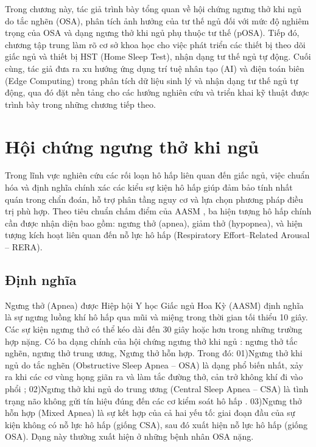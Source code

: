 
Trong chương này, tác giả trình bày tổng quan về hội chứng ngưng thở khi ngủ do
tắc nghẽn (OSA), phân tích ảnh hưởng của tư thế ngủ đối với mức độ nghiêm trọng
của OSA và dạng ngưng thở khi ngủ phụ thuộc tư thế (pOSA). Tiếp đó, chương tập
trung làm rõ cơ sở khoa học cho việc phát triển các thiết bị theo dõi giấc ngủ
và thiết bị HST (Home Sleep Test), nhận dạng tư thế ngủ tự động. Cuối cùng, tác
giả đưa ra xu hướng ứng dụng trí tuệ nhân tạo (AI) và điện toán biên (Edge
Computing) trong phân tích dữ liệu sinh lý và nhận dạng tư thế ngủ tự động, qua
đó đặt nền tảng cho các hướng nghiên cứu và triển khai kỹ thuật được trình bày
trong những chương tiếp theo.
\section{Hội chứng ngưng thở khi ngủ}

Trong lĩnh vực nghiên cứu các rối loạn hô hấp liên quan đến giấc ngủ, việc
chuẩn hóa và định nghĩa chính xác các kiểu sự kiện hô hấp giúp đảm bảo tính
nhất quán trong chẩn đoán, hỗ trợ phân tầng nguy cơ và lựa chọn phương pháp
điều trị phù hợp. Theo tiêu chuẩn chấm điểm của AASM \cite{berry2012scoring},
ba hiện tượng hô hấp chính cần được nhận diện bao gồm: ngưng thở (apnea), giảm
thở (hypopnea), và hiện tượng kích hoạt liên quan đến nỗ lực hô hấp
(Respiratory Effort–Related Arousal – RERA).

\subsection{Định nghĩa}

Ngưng thở (Apnea) được Hiệp hội Y học Giấc ngủ Hoa Kỳ (AASM) định nghĩa là sự
ngưng luồng khí hô hấp qua mũi và miệng trong thời gian tối thiểu 10 giây. Các
sự kiện ngưng thở có thể kéo dài đến 30 giây hoặc hơn trong những trường hợp
nặng. Có ba dạng chính của hội chứng ngưng thở khi ngủ \cite{ThaySYOSA}: ngưng
thở tắc nghẽn, ngưng thở trung ương, Ngưng thở hỗn hợp. Trong đó: 01)Ngưng thở
khi ngủ do tắc nghẽn (Obstructive Sleep Apnea – OSA) là dạng phổ biến nhất, xảy
ra khi các cơ vùng họng giãn ra và làm tắc đường thở, cản trở không khí đi vào
phổi \cite{osa_summary}; 02)Ngưng thở khi ngủ do trung ương (Central Sleep
Apnea – CSA) là tình trạng não không gửi tín hiệu đúng đến các cơ kiểm soát hô
hấp \cite{eckert2007csa}. 03)Ngưng thở hỗn hợp (Mixed Apnea) là sự kết hợp của
cả hai yếu tố: giai đoạn đầu của sự kiện không có nỗ lực hô hấp (giống CSA),
sau đó xuất hiện nỗ lực hô hấp (giống OSA). Dạng này thường xuất hiện ở những
bệnh nhân OSA nặng.

